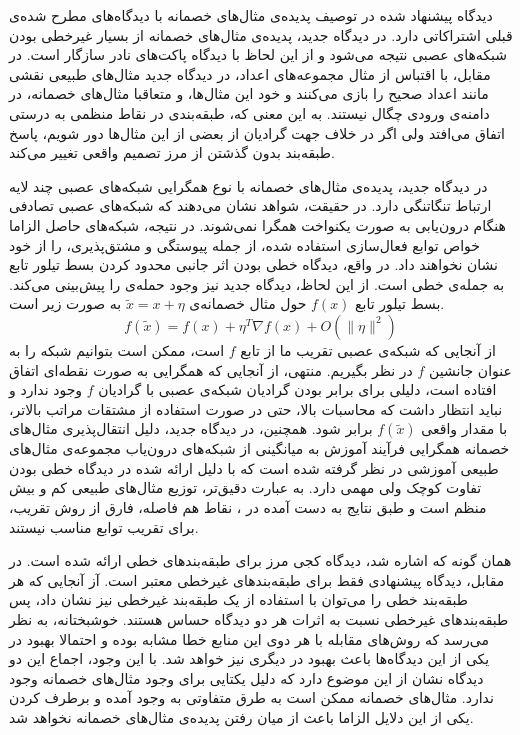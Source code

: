 \documentclass[12pt,onecolumn,a4paper]{article}
\begin{document}
دیدگاه پیشنهاد شده در توصیف پدیده‌ی مثال‌های خصمانه با دیدگاه‌های مطرح شده‌ی قبلی اشتراکاتی دارد. در دیدگاه جدید، پدیده‌ی مثال‌های خصمانه از بسیار غیرخطی بودن شبکه‌های عصبی نتیجه می‌شود و از این لحاظ با دیدگاه پاکت‌های نادر سازگار است. در مقابل، با اقتباس از مثال مجموعه‌های اعداد، در دیدگاه جدید مثال‌های طبیعی نقشی مانند اعداد صحیح را بازی می‌کنند و خود این مثال‌ها، و متعاقبا مثال‌های خصمانه، در دامنه‌ی ورودی چگال نیستند. به این معنی که، طبقه‌بندی در نقاط منظمی به درستی اتفاق می‌افتد ولی اگر در خلاف جهت گرادیان از بعضی از این مثال‌ها دور شویم، پاسخ طبقه‌بند بدون گذشتن از مرز تصمیم واقعی تغییر می‌کند.

در دیدگاه جدید، پدیده‌ی مثال‌های خصمانه با نوع همگرایی شبکه‌های عصبی چند لایه ارتباط تنگاتنگی دارد. در حقیقت، شواهد نشان می‌دهند که شبکه‌های عصبی تصادفی هنگام درون‌یابی به صورت یکنواخت همگرا نمی‌شوند. در نتیجه، شبکه‌های حاصل الزاما خواص توابع فعال‌سازی استفاده شده، از جمله پیوستگی و مشتق‌پذیری، را از خود نشان نخواهند داد. در واقع، دیدگاه خطی بودن اثر جانبی محدود کردن بسط تیلور تابع به جمله‌ی خطی است. از این لحاظ، دیدگاه جدید نیز وجود حمله‌ی
را پیش‌بینی می‌کند. بسط تیلور تابع $f(x)$ حول مثال خصمانه‌ی $\tilde{x}=x+\eta$ به صورت زیر است.
\begin{equation*}
f(\tilde{x})=f(x)+\eta^T\nabla f(x) + O(\|\eta\|^2)
\end{equation*}
از آنجایی که شبکه‌ی عصبی تقریب ما از تابع $f$ است، ممکن است بتوانیم شبکه را به عنوان جانشین $f$ در نظر بگیریم. منتهی، از آنجایی که همگرایی به صورت نقطه‌ای اتفاق افتاده است، دلیلی برای برابر بودن گرادیان شبکه‌ی عصبی با گرادیان $f$ وجود ندارد و نباید انتظار داشت که محاسبات بالا، حتی در صورت استفاده از مشتقات مراتب بالاتر، با مقدار واقعی $f(\tilde{x})$ برابر شود. همچنین، در دیدگاه جدید، دلیل انتقال‌پذیری مثال‌های خصمانه همگرایی فرآیند آموزش به میانگینی از شبکه‌های درون‌یاب مجموعه‌ی مثال‌های طبیعی آموزشی در نظر گرفته شده است که با دلیل ارائه شده در دیدگاه خطی بودن تفاوت کوچک ولی مهمی دارد. به عبارت دقیق‌تر، توزیع مثال‌های طبیعی کم و بیش منظم است و طبق نتایج به دست آمده در 
\cite{doi:10.1137/090774707}، 
نقاط هم فاصله، فارق از روش تقریب، برای تقریب توابع مناسب نیستند.

همان گونه که اشاره شد، دیدگاه کجی مرز برای طبقه‌بندهای خطی ارائه شده است. در مقابل، دیدگاه پیشنهادی فقط برای طبقه‌بندهای غیرخطی معتبر است. آز آنجایی که هر طبقه‌بند خطی را می‌توان با استفاده از یک طبقه‌بند غیرخطی نیز نشان داد، پس طبقه‌بندهای غیرخطی نسبت به اثرات هر دو دیدگاه حساس هستند. خوشبختانه، به نظر می‌رسد که روش‌های مقابله با هر دوی این منابع خطا مشابه بوده و احتمالا بهبود در یکی از این دیدگاه‌ها باعث بهبود در دیگری نیز خواهد شد. با این وجود، اجماع این دو دیدگاه نشان از این موضوع دارد که دلیل یکتایی برای وجود مثال‌های خصمانه وجود ندارد. مثال‌های خصمانه ممکن است به طرق متفاوتی به وجود آمده و برطرف کردن یکی از این دلایل الزاما باعث از میان رفتن پدیده‌ی مثال‌های خصمانه نخواهد شد.
\end{document}
